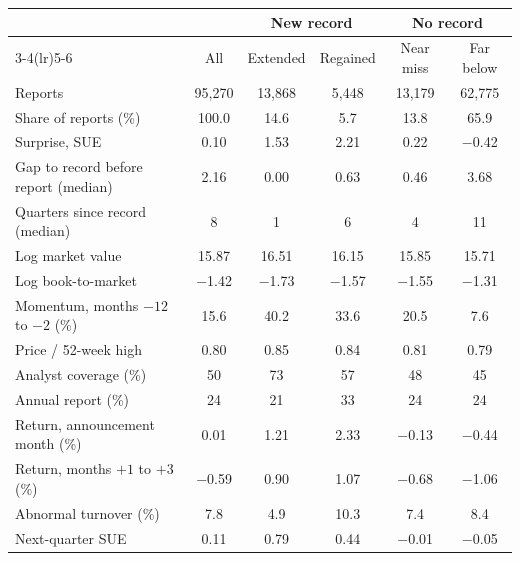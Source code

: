 \begin{tabular}{lccccc}
\toprule
 & & \multicolumn{2}{c}{New record} & \multicolumn{2}{c}{No record}\\
\cmidrule(lr){3-4}\cmidrule(lr){5-6}
 & All & Extended & Regained & Near miss & Far below\\
\midrule
Reports & 95,270 & 13,868 & 5,448 & 13,179 & 62,775\\
Share of reports (\%) & 100.0 & 14.6 & 5.7 & 13.8 & 65.9\\
Surprise, SUE & 0.10 & 1.53 & 2.21 & 0.22 & \ensuremath{-}0.42\\
Gap to record before report (median) & 2.16 & 0.00 & 0.63 & 0.46 & 3.68\\
Quarters since record (median) & 8 & 1 & 6 & 4 & 11\\
Log market value & 15.87 & 16.51 & 16.15 & 15.85 & 15.71\\
Log book-to-market & \ensuremath{-}1.42 & \ensuremath{-}1.73 & \ensuremath{-}1.57 & \ensuremath{-}1.55 & \ensuremath{-}1.31\\
Momentum, months $-12$ to $-2$ (\%) & 15.6 & 40.2 & 33.6 & 20.5 & 7.6\\
Price / 52-week high & 0.80 & 0.85 & 0.84 & 0.81 & 0.79\\
Analyst coverage (\%) & 50 & 73 & 57 & 48 & 45\\
Annual report (\%) & 24 & 21 & 33 & 24 & 24\\
Return, announcement month (\%) & 0.01 & 1.21 & 2.33 & \ensuremath{-}0.13 & \ensuremath{-}0.44\\
Return, months $+1$ to $+3$ (\%) & \ensuremath{-}0.59 & 0.90 & 1.07 & \ensuremath{-}0.68 & \ensuremath{-}1.06\\
Abnormal turnover (\%) & 7.8 & 4.9 & 10.3 & 7.4 & 8.4\\
Next-quarter SUE & 0.11 & 0.79 & 0.44 & \ensuremath{-}0.01 & \ensuremath{-}0.05\\
\bottomrule
\end{tabular}
